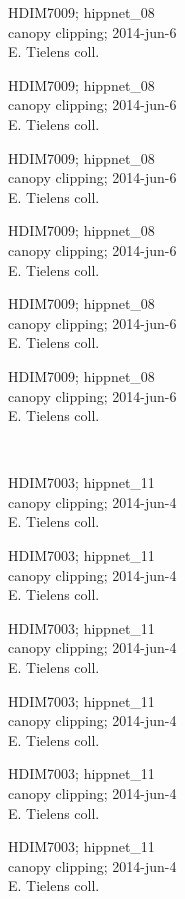 \documentclass[2pt]{extarticle}
\begin{document}
\noindent
\parbox{0.16\textwidth}{\tiny \raggedright \rule[-0.3\baselineskip]{0pt}{10pt}HDIM7009; hippnet\_08\\ canopy clipping; 2014-jun-6\\ E. Tielens coll.}
\parbox{0.16\textwidth}{\tiny \raggedright \rule[-0.3\baselineskip]{0pt}{10pt}HDIM7009; hippnet\_08\\ canopy clipping; 2014-jun-6\\ E. Tielens coll.}
\parbox{0.16\textwidth}{\tiny \raggedright \rule[-0.3\baselineskip]{0pt}{10pt}HDIM7009; hippnet\_08\\ canopy clipping; 2014-jun-6\\ E. Tielens coll.}
\parbox{0.16\textwidth}{\tiny \raggedright \rule[-0.3\baselineskip]{0pt}{10pt}HDIM7009; hippnet\_08\\ canopy clipping; 2014-jun-6\\ E. Tielens coll.}
\parbox{0.16\textwidth}{\tiny \raggedright \rule[-0.3\baselineskip]{0pt}{10pt}HDIM7009; hippnet\_08\\ canopy clipping; 2014-jun-6\\ E. Tielens coll.}
\parbox{0.16\textwidth}{\tiny \raggedright \rule[-0.3\baselineskip]{0pt}{10pt}HDIM7009; hippnet\_08\\ canopy clipping; 2014-jun-6\\ E. Tielens coll.} \\ 
\vspace{0.001in} 

\noindent
\parbox{0.16\textwidth}{\tiny \raggedright \rule[-0.3\baselineskip]{0pt}{10pt}HDIM7003; hippnet\_11\\ canopy clipping; 2014-jun-4\\ E. Tielens coll.}
\parbox{0.16\textwidth}{\tiny \raggedright \rule[-0.3\baselineskip]{0pt}{10pt}HDIM7003; hippnet\_11\\ canopy clipping; 2014-jun-4\\ E. Tielens coll.}
\parbox{0.16\textwidth}{\tiny \raggedright \rule[-0.3\baselineskip]{0pt}{10pt}HDIM7003; hippnet\_11\\ canopy clipping; 2014-jun-4\\ E. Tielens coll.}
\parbox{0.16\textwidth}{\tiny \raggedright \rule[-0.3\baselineskip]{0pt}{10pt}HDIM7003; hippnet\_11\\ canopy clipping; 2014-jun-4\\ E. Tielens coll.}
\parbox{0.16\textwidth}{\tiny \raggedright \rule[-0.3\baselineskip]{0pt}{10pt}HDIM7003; hippnet\_11\\ canopy clipping; 2014-jun-4\\ E. Tielens coll.}
\parbox{0.16\textwidth}{\tiny \raggedright \rule[-0.3\baselineskip]{0pt}{10pt}HDIM7003; hippnet\_11\\ canopy clipping; 2014-jun-4\\ E. Tielens coll.} \\ 
\vspace{0.001in} 
\end{document}
